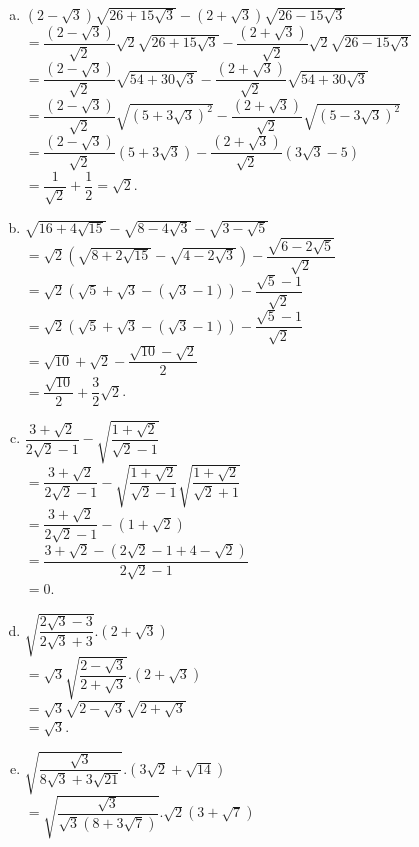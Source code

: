 \begin{bt}
{\begin{enumerate}[a)]
			\item  $(2-\sqrt{3})\sqrt{26+15\sqrt{3}}-(2+\sqrt{3})\sqrt{26-15\sqrt{3}} $\\
			$=\dfrac{(2-\sqrt{3})}{\sqrt{2}}\sqrt{2}\sqrt{26+15\sqrt{3}}-\dfrac{(2+\sqrt{3})}{\sqrt{2}}\sqrt{2}\sqrt{26-15\sqrt{3}} $\\
			$=\dfrac{(2-\sqrt{3})}{\sqrt{2}}\sqrt{54+30\sqrt{3}}-\dfrac{(2+\sqrt{3})}{\sqrt{2}}\sqrt{54+30\sqrt{3}}$\\
			$=\dfrac{(2-\sqrt{3})}{\sqrt{2}}\sqrt{(5+3\sqrt{3})^2}-\dfrac{(2+\sqrt{3})}{\sqrt{2}}\sqrt{(5-3\sqrt{3})^2}$\\
			$=\dfrac{(2-\sqrt{3})}{\sqrt{2}}(5+3\sqrt{3})-\dfrac{(2+\sqrt{3})}{\sqrt{2}}(3\sqrt{3}-5)$\\
			$=\dfrac{1}{\sqrt{2}}+\dfrac{1}{2}=\sqrt{2}$.	
			\item  $\sqrt{16+4\sqrt{15}}-\sqrt{8-4\sqrt{3}}-\sqrt{3-\sqrt{5}}$\\
			$=\sqrt{2}\left( \sqrt{8+2\sqrt{15}}-\sqrt{4-2\sqrt{3}}\right) -\dfrac{\sqrt{6-2\sqrt{5}}}{\sqrt{2}}$\\
			$=\sqrt{2}\left( \sqrt{5}+\sqrt{3}-(\sqrt{3}-1)\right) -\dfrac{\sqrt{5}-1}{\sqrt{2}}$\\
			$=\sqrt{2}\left( \sqrt{5}+\sqrt{3}-(\sqrt{3}-1)\right) -\dfrac{\sqrt{5}-1}{\sqrt{2}}$\\
			$=\sqrt{10}+\sqrt{2}-\dfrac{\sqrt{10}-\sqrt{2}}{2}$\\
			$=\dfrac{\sqrt{10}}{2}+\dfrac{3}{2}\sqrt{2}$.
			\item $\dfrac{3+\sqrt{2}}{2\sqrt{2}-1}-\sqrt{\dfrac{1+\sqrt{2}}{\sqrt{2}-1}} $\\
			$=\dfrac{3+\sqrt{2}}{2\sqrt{2}-1}-\sqrt{\dfrac{1+\sqrt{2}}{\sqrt{2}-1}}\sqrt{\dfrac{1+\sqrt{2}}{\sqrt{2}+1}} $\\
			$=\dfrac{3+\sqrt{2}}{2\sqrt{2}-1}-(1+\sqrt{2})$\\
			$=\dfrac{3+\sqrt{2}-(2\sqrt{2}-1+4-\sqrt{2})}{2\sqrt{2}-1}$\\
			$=0$.
			\item  $\sqrt{\dfrac{2\sqrt{3}-3}{2\sqrt{3}+3}}.(2+\sqrt{3}) $\\
			$=\sqrt{3}\sqrt{\dfrac{2-\sqrt{3}}{2+\sqrt{3}}}.(2+\sqrt{3}) $\\
			$=\sqrt{3}\sqrt{2-\sqrt{3}}\sqrt{2+\sqrt{3}} $\\
			$=\sqrt{3}$.
			\item  $\sqrt{ \dfrac{\sqrt{3}}{8\sqrt{3}+3\sqrt{21}}}.(3\sqrt{2} +\sqrt{14} ) $\\
			$=\sqrt{\dfrac{\sqrt{3}}{\sqrt{3} (8+3\sqrt{7})}}.\sqrt{2} (3+\sqrt{7}) $\\

\end{enumerate}}
\end{bt}
